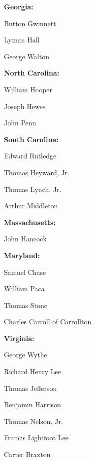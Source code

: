\begin{decliststates}
\item \textbf{Georgia:}
\begin{declistnames}
\item Button Gwinnett
\item Lyman Hall
\item George Walton
\end{declistnames}

\item \textbf{North Carolina:}
\begin{declistnames}
\item William Hooper
\item Joseph Hewes
\item John Penn
\end{declistnames}

\item \textbf{South Carolina:}
\begin{declistnames}
\item Edward Rutledge
\item Thomas Heyward, Jr.
\item Thomas Lynch, Jr.
\item Arthur Middleton
\end{declistnames}

\item \textbf{Massachusetts:}
\begin{declistnames}
\item John Hancock
\end{declistnames}

\item \textbf{Maryland:}
\begin{declistnames}
\item Samuel Chase
\item William Paca
\item Thomas Stone
\item Charles Carroll of Carrollton
\end{declistnames}

\item \textbf{Virginia:}
\begin{declistnames}
\item George Wythe
\item Richard Henry Lee
\item Thomas Jefferson
\item Benjamin Harrison
\item Thomas Nelson, Jr.
\item Francis Lightfoot Lee
\item Carter Braxton
\end{declistnames}


\end{decliststates}
